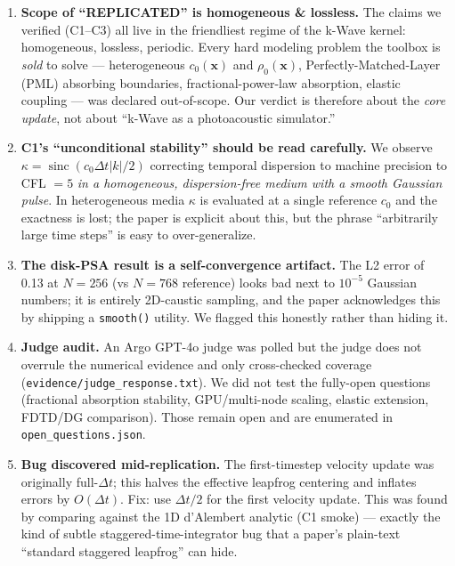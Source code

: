 \documentclass[11pt]{article}
\begin{document}
\begin{enumerate}
\item \textbf{Scope of ``REPLICATED'' is homogeneous \& lossless.}
The claims we verified (C1--C3) all live in the friendliest regime of the k-Wave
kernel: homogeneous, lossless, periodic. Every hard modeling problem the toolbox
is \emph{sold} to solve --- heterogeneous $c_0(\mathbf{x})$ and $\rho_0(\mathbf{x})$,
Perfectly-Matched-Layer (PML) absorbing boundaries, fractional-power-law
absorption, elastic coupling --- was declared out-of-scope. Our verdict is
therefore about the \emph{core update}, not about ``k-Wave as a photoacoustic
simulator.''

\item \textbf{C1's ``unconditional stability'' should be read carefully.} We
observe $\kappa=\operatorname{sinc}(c_0\Delta t|k|/2)$ correcting temporal
dispersion to machine precision to CFL $=5$ \emph{in a homogeneous, dispersion-free
medium with a smooth Gaussian pulse}. In heterogeneous media $\kappa$ is
evaluated at a single reference $c_0$ and the exactness is lost; the paper is
explicit about this, but the phrase ``arbitrarily large time steps'' is easy to
over-generalize.

\item \textbf{The disk-PSA result is a self-convergence artifact.} The L2 error
of \num{0.13} at $N=256$ (vs $N=768$ reference) looks bad next to $10^{-5}$
Gaussian numbers; it is entirely 2D-caustic sampling, and the paper acknowledges
this by shipping a \texttt{smooth()} utility. We flagged this honestly rather
than hiding it.

\item \textbf{Judge audit.} An Argo GPT-4o judge was polled but the judge does
not overrule the numerical evidence and only cross-checked coverage
(\texttt{evidence/judge\_response.txt}). We did not test the fully-open questions
(fractional absorption stability, GPU/multi-node scaling, elastic extension,
FDTD/DG comparison). Those remain open and are enumerated in
\texttt{open\_questions.json}.

\item \textbf{Bug discovered mid-replication.} The first-timestep velocity update
was originally full-$\Delta t$; this halves the effective leapfrog centering and
inflates errors by $O(\Delta t)$. Fix: use $\Delta t/2$ for the first velocity
update. This was found by comparing against the 1D d'Alembert analytic (C1
smoke) --- exactly the kind of subtle staggered-time-integrator bug that a
paper's plain-text ``standard staggered leapfrog'' can hide.
\end{enumerate}
\end{document}
